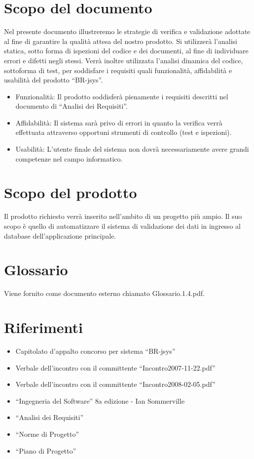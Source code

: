 \documentclass[11pt,titlepage,a4paper]{report}
\begin{document}
\section{Scopo del documento}
Nel presente documento illustreremo le strategie di verifica e validazione adottate al fine di garantire la qualit\`a attesa del nostro prodotto. Si utilizzer\`a l'analisi statica, sotto forma di ispezioni del codice e dei documenti, al fine di individuare errori e difetti negli stessi. Verr\`a inoltre utilizzata l'analisi dinamica del codice, sottoforma di test, per soddisfare i requisiti quali funzionalit\`a, affidabilit\`a e usabilit\`a del prodotto ``BR-jsys''.
\begin{itemize}
\item Funzionalit\`a: \newline
Il prodotto soddisfer\`a pienamente i requisiti descritti nel documento di ``Analisi dei Requisiti''.
\item Affidabilit\`a: \newline
Il sistema sar\`a privo di errori in quanto la verifica verr\`a effettuata attraverso opportuni strumenti di controllo (test e ispezioni).
\item Usabilit\`a:
L'utente finale del sistema non dovr\`a necessariamente avere grandi competenze nel campo informatico.
\end{itemize}

\section{Scopo del prodotto}
Il prodotto richiesto verr\`a inserito nell'ambito di un progetto pi\`u ampio. Il suo scopo \`e quello di automatizzare il sistema di validazione dei dati in ingresso al database dell'applicazione principale.

\section{Glossario}
Viene fornito come documento esterno chiamato Glossario.1.4.pdf.
\section{Riferimenti}
\begin{itemize}
\item Capitolato d'appalto concorso per sistema ``BR-jsys''
\item Verbale dell'incontro con il committente ``Incontro2007-11-22.pdf''
\item Verbale dell'incontro con il committente ``Incontro2008-02-05.pdf''
\item ``Ingegneria del Software'' 8a edizione - Ian Sommerville
\item ``Analisi dei Requisiti''
\item ``Norme di Progetto''
\item ``Piano di Progetto''
\end{itemize}
\end{document}
